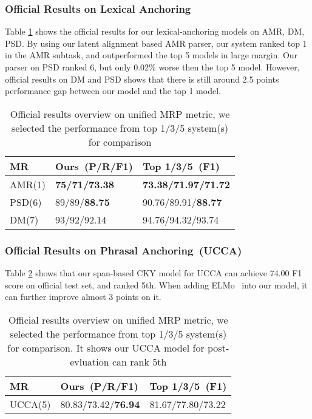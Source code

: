\subsubsection{Official Results on Lexical Anchoring}
\label{sssec:lex-phr:lex-results}
Table \ref{tbl:results_rank} shows the official results for our
lexical-anchoring models on AMR, DM, PSD.  By using our latent
alignment based AMR parser, our system ranked top 1 in the AMR subtask,
and outperformed the top 5 models in large margin. Our parser on PSD
ranked 6, but only 0.02\% worse then the top 5 model. However, official
results on DM and PSD shows that there is still around 2.5 points
performance gap between our model and the top 1 model.

\begin{table}[!h]
\caption{\label{tbl:results_rank} Official results overview on unified MRP metric, we selected the performance from top 1/3/5 system(s) for comparison}
\centering
\begin{tabular}{lll}
\toprule
MR     & Ours~(P/R/F1) & Top 1/3/5~(F1)  \\ \hline
AMR(1) & {\bf 75/71/73.38}   & {\bf 73.38/71.97/71.72} \\
PSD(6) & 89/89/{\bf 88.75}   & 90.76/89.91/{\bf 88.77} \\
DM(7)  & 93/92/92.14   & 94.76/94.32/93.74 \\ \hline
\end{tabular}
\end{table}

\subsubsection{Official Results on Phrasal Anchoring~(UCCA)}
\label{sssec:lex-phr:ucca-results}
Table \ref{tbl:ucca_results_rank} shows that our span-based CKY model
for UCCA can achieve 74.00 F1 score on official test set, and ranked
5th. When adding ELMo~\cite{peters2018deep} into our model, it can
further improve almost 3 points on it.
\begin{table}[!h]
\caption{\label{tbl:ucca_results_rank} Official results overview on
  unified MRP metric, we selected the performance from top 1/3/5
  system(s) for comparison. It shows our UCCA model for post-evluation
  can rank 5th}
  \small
\centering
\begin{tabular}{lll}
\toprule
MR     & Ours~(P/R/F1) & Top 1/3/5~(F1)  \\ \hline
UCCA(5)   & 80.83/73.42/\textbf{76.94}   & 81.67/77.80/73.22 \\
\bottomrule
\end{tabular}
\end{table}


